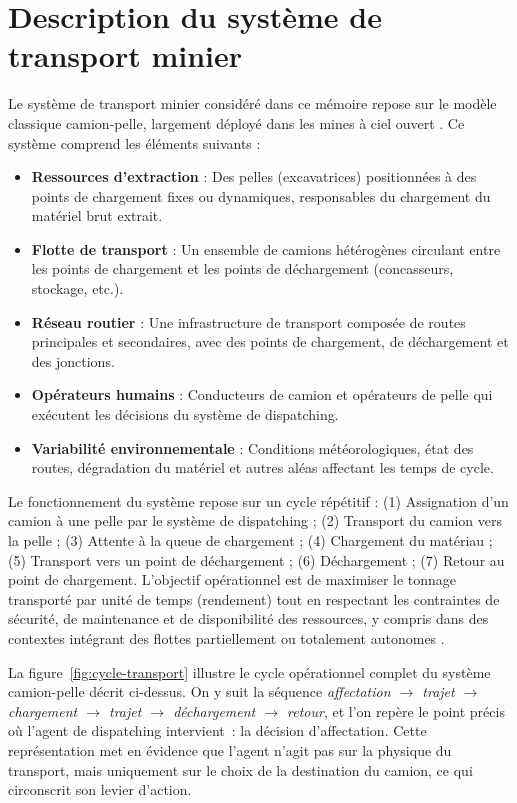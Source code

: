 \documentclass[11pt,a4paper]{report}
\begin{document}
\section{Description du système de transport minier}
\label{sec:description-systeme}

Le système de transport minier considéré dans ce mémoire repose sur le modèle classique camion-pelle, largement déployé dans les mines à ciel ouvert \cite{MohanMunirathinam1994, Alarie2002, AlexandraMNewman2010}. Ce système comprend les éléments suivants :

\begin{itemize}
    \item \textbf{Ressources d'extraction} : Des pelles (excavatrices) positionnées à des points de chargement fixes ou dynamiques, responsables du chargement du matériel brut extrait.
    \item \textbf{Flotte de transport} : Un ensemble de camions hétérogènes circulant entre les points de chargement et les points de déchargement (concasseurs, stockage, etc.).
    \item \textbf{Réseau routier} : Une infrastructure de transport composée de routes principales et secondaires, avec des points de chargement, de déchargement et des jonctions.
    \item \textbf{Opérateurs humains} : Conducteurs de camion et opérateurs de pelle qui exécutent les décisions du système de dispatching.
    \item \textbf{Variabilité environnementale} : Conditions météorologiques, état des routes, dégradation du matériel et autres aléas affectant les temps de cycle.
\end{itemize}

Le fonctionnement du système repose sur un cycle répétitif : (1) Assignation d'un camion à une pelle par le système de dispatching ; (2) Transport du camion vers la pelle ; (3) Attente à la queue de chargement ; (4) Chargement du matériau ; (5) Transport vers un point de déchargement ; (6) Déchargement ; (7) Retour au point de chargement. L'objectif opérationnel est de maximiser le tonnage transporté par unité de temps (rendement) tout en respectant les contraintes de sécurité, de maintenance et de disponibilité des ressources, y compris dans des contextes intégrant des flottes partiellement ou totalement autonomes \cite{MehrnazMohtasham2023, PeiYangGong2026}.

La figure~\ref{fig:cycle-transport} illustre le cycle op\'erationnel complet du syst\`eme camion-pelle d\'ecrit ci-dessus. On y suit la s\'equence \emph{affectation $\rightarrow$ trajet $\rightarrow$ chargement $\rightarrow$ trajet $\rightarrow$ d\'echargement $\rightarrow$ retour}, et l'on rep\`ere le point pr\'ecis o\`u l'agent de dispatching intervient~: la d\'ecision d'affectation. Cette repr\'esentation met en \'evidence que l'agent n'agit pas sur la physique du transport, mais uniquement sur le choix de la destination du camion, ce qui circonscrit son levier d'action.
\end{document}
